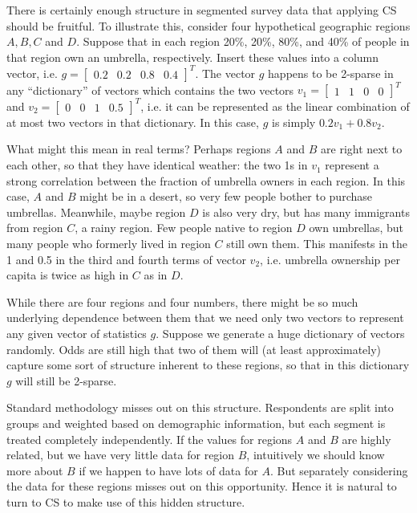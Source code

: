 There is certainly enough structure in segmented survey data that applying CS should be fruitful.
To illustrate this, consider four hypothetical geographic regions $A, B, C$ and $D$.
Suppose that in each region 20\%, 20\%, 80\%, and 40\% of people in that region own an umbrella, respectively.
Insert these values into a column vector, i.e. $g = \begin{bmatrix} 0.2 & 0.2 & 0.8 & 0.4 \end{bmatrix}^T$.
The vector $g$ happens to be 2-sparse in any ``dictionary'' of vectors which contains the two vectors $v_1 = \begin{bmatrix} 1 & 1 & 0 & 0 \end{bmatrix}^T$ and $v_2 = \begin{bmatrix} 0 & 0 & 1 & 0.5\end{bmatrix}^T$, i.e. it can be represented as the linear combination of at most two vectors in that dictionary.
In this case, $g$ is simply $0.2v_1 + 0.8v_2$.

What might this mean in real terms?
Perhaps regions $A$ and $B$ are right next to each other, so that they have identical weather: the two 1s in $v_1$ represent a strong correlation between the fraction of umbrella owners in each region.
In this case, $A$ and $B$ might be in a desert, so very few people bother to purchase umbrellas.
Meanwhile, maybe region $D$ is also very dry, but has many immigrants from region $C$, a rainy region.
Few people native to region $D$ own umbrellas, but many people who formerly lived in region $C$ still own them.
This manifests in the 1 and 0.5 in the third and fourth terms of vector $v_2$, i.e. umbrella ownership per capita is twice as high in $C$ as in $D$.

While there are four regions and four numbers, there might be so much underlying dependence between them that we need only two vectors to represent any given vector of statistics $g$.
Suppose we generate a huge dictionary of vectors randomly.
Odds are still high that two of them will (at least approximately) capture some sort of structure inherent to these regions, so that in this dictionary $g$ will still be 2-sparse.

Standard methodology misses out on this structure.
Respondents are split into groups and weighted based on demographic information, but each segment is treated completely independently.
If the values for regions $A$ and $B$ are highly related, but we have very little data for region $B$, intuitively we should know more about $B$ if we happen to have lots of data for $A$.
But separately considering the data for these regions misses out on this opportunity.
Hence it is natural to turn to CS to make use of this hidden structure.

